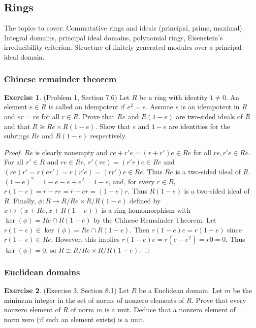 \documentclass[12pt, psamsfonts]{amsart}
\theoremstyle{definition}
\newtheorem*{exer}{Exercise}
\theoremstyle{remark}
\numberwithin{equation}{section}
\begin{document}
\subsection{Rings}
The topics to cover: Commutative rings and ideals (principal, prime, maximal).
Integral domains, principal ideal domains, polynomial rings, Eisenstein's irreducibility criterion.
Structure of finitely generated modules over a principal ideal domain.

\subsubsection{Chinese remainder theorem}

\begin{exer}{(Problem 1, Section 7.6)}
  Let $R$ be a ring with identity $1 \ne 0$.
  An element $e \in R$ is called an idempotent if $e^2 = e$.
  Assume $e$ is an idempotent in $R$ and $er = re$ for all $r \in R$.
  Prove that $Re$ and $R(1 - e)$ are two-sided ideals of $R$ and that $R \cong Re \times R(1 - e)$.
  Show that $e$ and $1 - e$ are identities for the subrings $Re$ and $R(1 - e)$ respectively.
\end{exer}

\begin{proof}
  $Re$ is clearly nonempty and $re + r'e = (r + r')e \in Re$ for all $re, r'e \in Re$.
  For all $r' \in R$ and $re \in Re$, $r'(re) = (r'r)e \in Re$ and $(re)r' = r(er') = r(r'e) = (rr')e \in Re$.
  Thus $Re$ is a two-sided ideal of $R$.
  $(1 - e)^2 = 1 - e - e + e^2 = 1 - e$, and, for every $r \in R$, $r(1 - e) = r - re = r - er = (1 - e)r$.
  Thus $R(1 - e)$ is a two-sided ideal of $R$.
  Finally, $\phi: R \rightarrow R / Re \times R / R(1 - e)$ defined by $x \mapsto (x + Re, x + R(1 - e))$ is a ring homomorphism with $\ker(\phi) = Re \cap R(1 - e)$ by the Chinese Remainder Theorem.
  Let $r(1 - e) \in \ker(\phi) = Re \cap R(1 - e)$.
  Then $r(1 - e)e = r(1 - e)$ since $r(1 - e) \in Re$.
  However, this implies $r(1 - e)e = r(e - e^2) = r0 = 0$.
  Thus $\ker(\phi) = 0$, so $R \cong R / Re \times R / R(1 - e)$.
\end{proof}

\subsubsection{Euclidean domains}

\begin{exer}{(Exercise 3, Section 8.1)}
  Let $R$ be a Euclidean domain.
  Let $m$ be the minimum integer in the set of norms of nonzero elements of $R$.
  Prove that every nonzero element of $R$ of norm $m$ is a unit.
  Deduce that a nonzero element of norm zero (if such an element exists) is a unit.
\end{exer}
\end{document}

